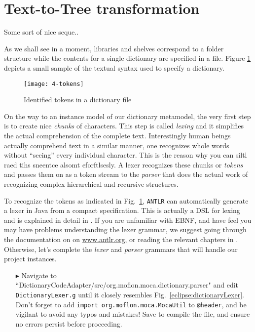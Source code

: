 \newpage
\section{Text-to-Tree transformation}
\genHeader

Some sort of nice seque..

As we shall see in a moment, libraries and shelves correspond to a folder structure while the contents for a single dictionary are specified in a file.
Figure \ref{fig:moca-4-Tokens} depicts a small sample of the textual syntax used to specify a dictionary. 

\begin{figure}[!htbp]
\begin{center}
 \texttt{[image: 4-tokens]}
  \caption{Identified tokens in a dictionary file}
  \label{fig:moca-4-Tokens}
\end{center}
\end{figure}

On the way to an instance model of our dictionary metamodel, the very first step is to create nice \emph{chunks} of characters. This step is called
\emph{lexing} and it simplifies the actual comprehension of the complete text. Interestingly human beings actually comprehend text in a similar manner, one
recognizes whole words without ``seeing'' every individual character. This is the reason why you can siltl raed tihs sneentce alsomt eforftlsesly. A lexer
recognizes these chunks or \emph{tokens} and passes them on as a token stream to the \emph{parser} that does the actual work of recognizing complex
hierarchical and recursive structures.
   
To recognize the tokens as indicated in Fig.~\ref{fig:moca-4-Tokens}, \texttt{ANTLR} can automatically generate a lexer in Java from a compact specification.
This is actually a DSL for lexing and is explained in detail in \cite{ANTLR}. If you are unfamiliar with EBNF, and have feel you may have problems understanding
the lexer grammar, we suggest going through the documentation on on \url{www.antlr.org}, or reading the relevant chapters in \cite{ANTLR}. Otherwise, let's
complete the \emph{lexer} and \emph{parser} grammars that will handle our project instances.

\begin{itemize}
  
\item[$\blacktriangleright$] Navigate to ``Diction\-ary\-Code\-Adap\-ter/src/org.moflon.moca.dict\-ion\-ary\-.pars\-er" and edit \texttt{DictionaryLexer.g}
until it closely resembles Fig.~\ref{eclipse:dictionaryLexer}. Don't forget to add \texttt{import org.moflon.moca.MocaUtil} to \texttt{@header}, and be vigilant
to avoid any typos and mistakes! Save to compile the file, and ensure no errors persist before proceeding.

\end{itemize}
\newpage


